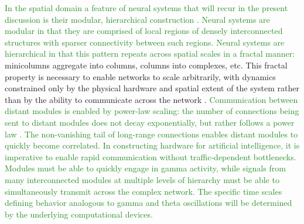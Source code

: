 \documentclass[twocolumn]{article}
\begin{document}
\textcolor{ForestGreen}{In the spatial domain a feature of neural systems that will recur in the present discussion is their modular, hierarchical construction \cite{sp2010,mela2010,beba2017,khma2018}. Neural systems are modular in that they are comprised of local regions of densely interconnected structures with sparser connectivity between such regions. Neural systems are hierarchical in that this pattern repeats across spatial scales in a fractal manner:} minicolumns aggregate into columns, columns into complexes, etc. This fractal property is necessary to enable networks to scale arbitrarily, with dynamics constrained only by the physical hardware and spatial extent of the system rather than by the ability to communicate across the network \cite{plth2006}. \textcolor{ForestGreen}{Communication between distant modules is enabled by power-law scaling: the number of connections being sent to distant modules does not decay exponentially, but rather follows a power law \cite{bagr2010,spte2016}. The non-vanishing tail of long-range connections enables distant modules to quickly become correlated. In constructing hardware for artificial intelligence, it is imperative to enable rapid communication without traffic-dependent bottlenecks. Modules must be able to quickly engage in gamma activity, while signals from many interconnected modules at multiple levels of hierarchy must be able to simultaneously transmit across the complex network. The specific time scales defining behavior analogous to gamma and theta oscillations will be determined by the underlying computational devices.}
\end{document}
